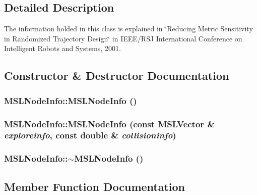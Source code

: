 \subsection{Detailed Description}
The information holded in this class is explained in \char`\"{}Reducing Metric Sensitivity in Randomized Trajectory Design\char`\"{} in IEEE/RSJ International Conference on Intelligent Robots and Systems, 2001.



\subsection{Constructor \& Destructor Documentation}
\subsubsection{\setlength{\rightskip}{0pt plus 5cm}MSLNode\-Info::MSLNode\-Info ()\hspace{0.3cm}{\tt  [inline]}}\label{classMSLNodeInfo_a4}


\subsubsection{\setlength{\rightskip}{0pt plus 5cm}MSLNode\-Info::MSLNode\-Info (const {\bf MSLVector} \& {\em exploreinfo}, const double \& {\em collisioninfo})\hspace{0.3cm}{\tt  [inline]}}\label{classMSLNodeInfo_a5}


\subsubsection{\setlength{\rightskip}{0pt plus 5cm}MSLNode\-Info::$\sim$MSLNode\-Info ()}\label{classMSLNodeInfo_a6}




\subsection{Member Function Documentation}
